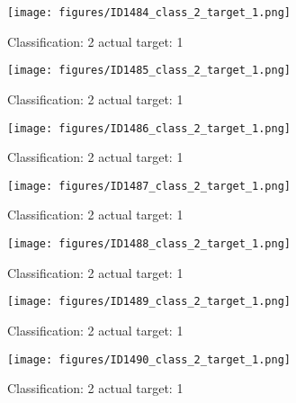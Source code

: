 \begin{figure}[h!]
\begin{center}
\texttt{[image: figures/ID1484\_class\_2\_target\_1.png]}
\end{center}
\caption{ Classification: 2 actual target: 1}
\label{fig:ID1484_class_2_target_1}
\end{figure}
\begin{figure}[h!]
\begin{center}
\texttt{[image: figures/ID1485\_class\_2\_target\_1.png]}
\end{center}
\caption{ Classification: 2 actual target: 1}
\label{fig:ID1485_class_2_target_1}
\end{figure}
\begin{figure}[h!]
\begin{center}
\texttt{[image: figures/ID1486\_class\_2\_target\_1.png]}
\end{center}
\caption{ Classification: 2 actual target: 1}
\label{fig:ID1486_class_2_target_1}
\end{figure}
\begin{figure}[h!]
\begin{center}
\texttt{[image: figures/ID1487\_class\_2\_target\_1.png]}
\end{center}
\caption{ Classification: 2 actual target: 1}
\label{fig:ID1487_class_2_target_1}
\end{figure}
\begin{figure}[h!]
\begin{center}
\texttt{[image: figures/ID1488\_class\_2\_target\_1.png]}
\end{center}
\caption{ Classification: 2 actual target: 1}
\label{fig:ID1488_class_2_target_1}
\end{figure}
\begin{figure}[h!]
\begin{center}
\texttt{[image: figures/ID1489\_class\_2\_target\_1.png]}
\end{center}
\caption{ Classification: 2 actual target: 1}
\label{fig:ID1489_class_2_target_1}
\end{figure}
\begin{figure}[h!]
\begin{center}
\texttt{[image: figures/ID1490\_class\_2\_target\_1.png]}
\end{center}
\caption{ Classification: 2 actual target: 1}
\label{fig:ID1490_class_2_target_1}
\end{figure}
